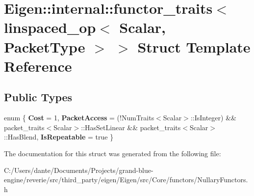 \hypertarget{struct_eigen_1_1internal_1_1functor__traits_3_01linspaced__op_3_01_scalar_00_01_packet_type_01_4_01_4}{}\section{Eigen\+::internal\+::functor\+\_\+traits$<$ linspaced\+\_\+op$<$ Scalar, Packet\+Type $>$ $>$ Struct Template Reference}
\label{struct_eigen_1_1internal_1_1functor__traits_3_01linspaced__op_3_01_scalar_00_01_packet_type_01_4_01_4}
\subsection*{Public Types}
\begin{DoxyCompactItemize}
\item 
\mbox{\label{struct_eigen_1_1internal_1_1functor__traits_3_01linspaced__op_3_01_scalar_00_01_packet_type_01_4_01_4_a85f8da058a49c3638e0c41c59ec9bab4}} 
enum \{ {\bfseries Cost} = 1, 
{\bfseries Packet\+Access} = (!\+Num\+Traits$<$Scalar$>$\+::Is\+Integer) \&\& packet\+\_\+traits$<$Scalar$>$\+::Has\+Set\+Linear \&\& packet\+\_\+traits$<$Scalar$>$\+::Has\+Blend, 
{\bfseries Is\+Repeatable} = true
 \}
\end{DoxyCompactItemize}


The documentation for this struct was generated from the following file\+:\begin{DoxyCompactItemize}
\item 
C\+:/\+Users/dante/\+Documents/\+Projects/grand-\/blue-\/engine/reverie/src/third\+\_\+party/eigen/\+Eigen/src/\+Core/functors/Nullary\+Functors.\+h\end{DoxyCompactItemize}

